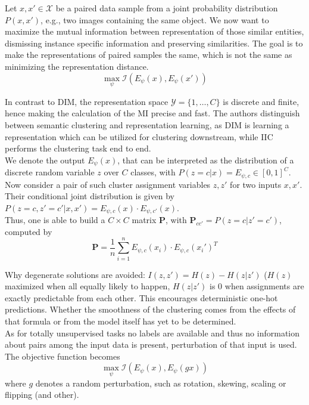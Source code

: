 \documentclass[]{article}
\begin{document}
Let $x, x' \in \mathcal{X}$ be a paired data sample from a joint probability distribution $P(x,x')$, e.g., two images containing the same object. We now want to maximize the mutual information between representation of those similar entities, dismissing instance specific information and preserving similarities. The goal is to make the representations of paired samples the same, which is not the same as minimizing the representation distance.
\begin{equation}
	\max_\psi \mathcal{I}(E_\psi(x),E_\psi(x'))
\end{equation}

In contrast to DIM, the representation space $\mathcal{Y} = \{1,\dots,C\}$ is discrete and finite, hence making the calculation of the MI precise and fast. The authors distinguish between semantic clustering and representation learning, as DIM is learning a representation which can be utilized for clustering downstream, while IIC performs the clustering task end to end.\\ 

We denote the output $E_\psi(x)$, that can be interpreted as the distribution of a discrete random variable $z$ over $C$ classes, with $P(z=c|x) = E_{\psi,c} \in [0,1]^C$.\\
Now consider a pair of such  cluster assignment variables $z, z'$ for two inputs $x,x'$. Their conditional joint distribution is given by $P(z=c, z'=c'|x,x') = E_{\psi,c}(x) \cdot E_{\psi,c'}(x)$.\\

Thus, one is able to build a $C\times C$ matrix $\mathbf{P}$, with $\mathbf{P}_{cc'} = P(z=c|z'=c')$, computed by
\begin{equation}
	\mathbf{P} = \frac{1}{n}\sum_{i=1}^{n}E_{\psi,c}(x_i) \cdot E_{\psi,c}(x_i')^T
\end{equation}

Why degenerate solutions are avoided: $I(z,z') = H(z) - H(z|z')$ ($H(z)$ maximized when all equally likely to happen, $H(z|z')$ is $0$ when assignments are exactly predictable from each other. This encourages deterministic one-hot predictions. Whether the smoothness of the clustering comes from the effects of that formula or from the model itself has yet to be determined.\\

As for totally unsupervised tasks no labels are available and thus no information about pairs among the input data is present, perturbation of that input is used. The objective function becomes
\begin{equation}
\max_\psi\mathcal{I}(E_\psi(x),E_\psi(gx))
\end{equation}
where $g$ denotes a random perturbation, such as rotation, skewing, scaling or flipping (and other).\\
\end{document}

